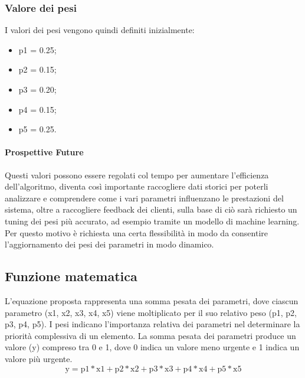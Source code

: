 \subsubsection{Valore dei pesi}
I valori dei pesi vengono quindi definiti inizialmente:
\begin{itemize}
	\item p1 = 0.25;
	\item p2 = 0.15;
	\item p3 = 0.20;
	\item p4 = 0.15;
	\item p5 = 0.25.
\end{itemize}
\paragraph{Prospettive Future} Questi valori possono essere regolati col tempo per aumentare l’efficienza dell’algoritmo, diventa così importante raccogliere dati storici per poterli analizzare e comprendere come i vari parametri influenzano le prestazioni del sistema, oltre a raccogliere feedback dei clienti, sulla base di ciò sarà richiesto un tuning dei pesi più accurato, ad esempio tramite un modello di machine learning. Per questo motivo è richiesta una certa flessibilità in modo da consentire l'aggiornamento dei pesi dei parametri in modo dinamico.

\subsection{Funzione matematica}
L'equazione proposta rappresenta una somma pesata dei parametri, dove ciascun parametro (x1, x2, x3, x4, x5) viene moltiplicato per il suo relativo peso (p1, p2, p3, p4, p5). I pesi indicano l'importanza relativa dei parametri nel determinare la priorità complessiva di un elemento. La somma pesata dei parametri produce un valore (y) compreso tra 0 e 1, dove 0 indica un valore meno urgente e 1 indica un valore più urgente.
\begin{equation*}
	\text{y} = \text{p1}*{\text{x1}} + \text{p2}*{\text{x2}}  + \text{p3}*{\text{x3}}  + \text{p4}*{\text{x4}}  + \text{p5}*{\text{x5}}
\end{equation*}

\clearpage
